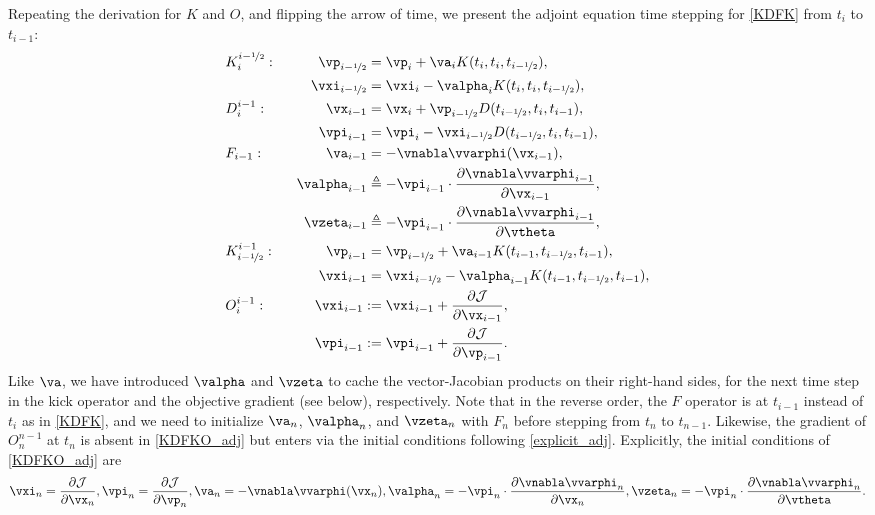 \documentclass[modern, dvipsnames]{aastex631}
\newcommand{\p}{\partial}
\newcommand{\cJ}{\mathcal{J}}
\newcommand{\half}{\nicefrac12}
\begin{document}
Repeating the derivation for $K$ and $O$, and flipping the arrow of
time, we present the adjoint equation time stepping for \eqref{KDFK}
from $t_i$ to $t_{i-1}$:
%
\begin{alignat}{2}
&K_i^{i-\half}: &\qquad \vp_{i-\half} &= \vp_i
  + \va_i K(t_i, t_i, t_{i-\half}), \nonumber\\
&& \vxi_{i-\half} &= \vxi_i
  - \valpha_i K(t_i, t_i, t_{i-\half}), \nonumber\\
%
&D_i^{i-1}: & \vx_{i-1} &= \vx_i
  + \vp_{i-\half} D(t_{i-\half}, t_i, t_{i-1}), \nonumber\\
&& \vpi_{i-1} &= \vpi_i
  - \vxi_{i-\half} D(t_{i-\half}, t_i, t_{i-1}), \nonumber\\
%
&F_{i-1}: & \va_{i-1} &= -\vnabla\vvarphi(\vx_{i-1}), \nonumber\\
&& \valpha_{i-1} &\triangleq - \vpi_{i-1}
  \cdot \frac{\p\vnabla\vvarphi_{i-1}}{\p\vx_{i-1}}, \nonumber\\
&& \vzeta_{i-1} &\triangleq - \vpi_{i-1}
  \cdot \frac{\p\vnabla\vvarphi_{i-1}}{\p\vtheta}, \nonumber\\
%
&K_{i-\half}^{i-1}: & \vp_{i-1} &= \vp_{i-\half}
  + \va_{i-1} K(t_{i-1}, t_{i-\half}, t_{i-1}), \nonumber\\
&& \vxi_{i-1} &= \vxi_{i-\half}
  - \valpha_{i-1} K(t_{i-1}, t_{i-\half}, t_{i-1}), \nonumber\\
%
&O_i^{i-1}: &\qquad \vxi_{i-1} :\:\!\!\!&= \vxi_{i-1}
  + \frac{\p\cJ}{\p\vx_{i-1}}, \nonumber\\
&& \vpi_{i-1} :\:\!\!\!&= \vpi_{i-1} + \frac{\p\cJ}{\p\vp_{i-1}}.
\label{KDFKO_adj}
\end{alignat}
%
Like $\va$, we have introduced $\valpha$ and $\vzeta$ to cache the
vector-Jacobian products on their right-hand sides, for the next time
step in the kick operator and the objective gradient (see below),
respectively.
Note that in the reverse order, the $F$ operator is at $t_{i-1}$ instead
of $t_i$ as in \eqref{KDFK}, and we need to initialize $\va_n$,
$\valpha_n$, and $\vzeta_n$ with $F_n$ before stepping from $t_n$ to
$t_{n-1}$.
Likewise, the gradient of $O_n^{n-1}$ at $t_n$ is absent in
\eqref{KDFKO_adj} but enters via the initial conditions following
\eqref{explicit_adj}.
Explicitly, the initial conditions of \eqref{KDFKO_adj} are
%
\begin{equation}
\vxi_n = \frac{\p\cJ}{\p\vx_n},
\vpi_n = \frac{\p\cJ}{\p\vp_n},
\va_n = -\vnabla\vvarphi(\vx_n),
\valpha_n = - \vpi_n \cdot \frac{\p\vnabla\vvarphi_n}{\p\vx_n},
\vzeta_n = - \vpi_n \cdot \frac{\p\vnabla\vvarphi_n}{\p\vtheta}.
\end{equation}
\end{document}
